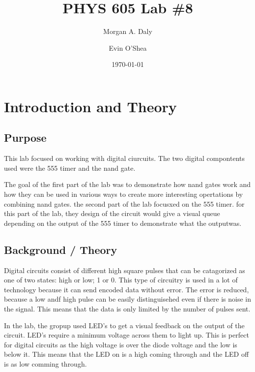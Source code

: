 \documentclass[twocolumn, amsmath]{revtex4}
\begin{document}
\title{PHYS 605 Lab \#8} 

\author{Morgan A. Daly}
\author{Evin O'Shea}
\date{\today} 


\maketitle


\section{Introduction and Theory}
\subsection{Purpose}

This lab focused on working with digital ciurcuits. The two digital compontents used were the 555 timer and the nand gate. 

The goal of the first part of the lab was to demonstrate how nand gates work and how they can be used in various ways to create more interesting opertations by combining nand gates. 
the second part of the lab focusxed on the 555 timer. for this part of the lab, they design of the circuit would give a visual queue depending on the output of the 555 timer to demonstrate what the outputwas.



\subsection{Background / Theory}



Digital circuits consist of different high square pulses that can be catagorized as one of two states: high or low; 1 or 0. This type of circuitry is used in a lot of technology because it can send encoded data without error. The error is reduced, because a low andf high pulse can be easily distinguisehed even if there is noise in the signal. This means that the data is only limited by the number of pulses sent.

In the lab, the gropup used LED's to get a visual feedback on the output of the circuit. 
LED's require a minimum voltage across them to light up. This is perfect for digital circuits as the high voltage is over the diode voltage and the low is below it. This means that the LED on is a high coming through and the LED off is as low comming through.
\end{document}
